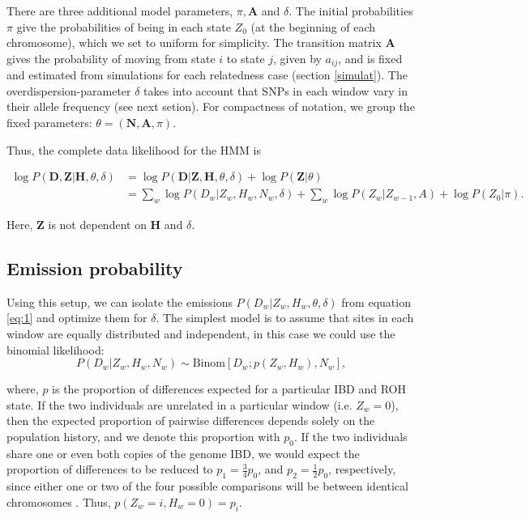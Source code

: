 \documentclass[12pt, letterpaper]{article}
\newcommand{\BZ}{\mathbf{Z}}
\newcommand{\BD}{\mathbf{D}}
\newcommand{\BN}{\mathbf{N}}
\newcommand{\BH}{\mathbf{H}}
\begin{document}
There are three additional model parameters, $\pi, \mathbf{A}$ and $\delta$. The initial probabilities $\pi$ give the probabilities of being in each state $Z_0$ (at the beginning of each chromosome), which we set to uniform for simplicity. The transition matrix $\mathbf{A}$ gives the probability of moving from state $i$ to state $j$, given by $a_{ij}$, and is fixed and estimated from simulations for each relatedness case (section \ref{simulat}). The overdispersion-parameter $\delta$ takes into account that SNPs in each window vary in their allele frequency (see next setion).  For compactness of notation, we group the fixed parameters: $\theta = (\BN, \mathbf{A}, \pi)$. 

Thus, the complete data likelihood for the HMM is

\begin{align}\label{eq:1}
\log P(\BD,\BZ|\BH, \theta, \delta) &= \log P(\BD|\BZ,\BH, \theta, \delta) + \log P(\BZ |\theta) \nonumber\\
&= \sum_w \log P(D_w|Z_w,H_w, N_w, \delta) + \sum_w \log P(Z_w |Z_{w-1},A) + \log P(Z_0|\pi)\text{.}
\end{align}

Here, $\BZ$ is not dependent on $\BH$ and $\delta$.

\subsection{Emission probability}\label{B}

Using this setup, we can isolate the emissions $P(D_w | Z_w, H_w ,\theta, \delta)$ from equation \ref{eq:1} and optimize them for $\delta$. The simplest model is to assume that sites in each window are equally distributed and independent, in this case we could use the  binomial likelihood:
$$P(D_w|Z_w, H_w, N_w) \sim \text{Binom}[D_w ; p(Z_w, H_w), N_w] \text{,}$$

where, $p$ is the proportion of differences expected for a particular IBD and ROH state. If the two individuals are unrelated in a particular window (i.e. $Z_w = 0$), then the expected proportion of pairwise differences depends solely on the population history, and we denote this proportion with $p_0$. If the two individuals share one or even both copies of the genome IBD, we would expect the proportion of differences to be reduced to $p_1 = \frac{3}{4} p_0$, and $p_2 = \frac{1}2 p_0$, respectively, since either one or two of the four possible comparisons will be between identical chromosomes \cite{kuhn_estimating_2018}. Thus, $p(Z_w=i, H_w=0) = p_i$.
\end{document}
